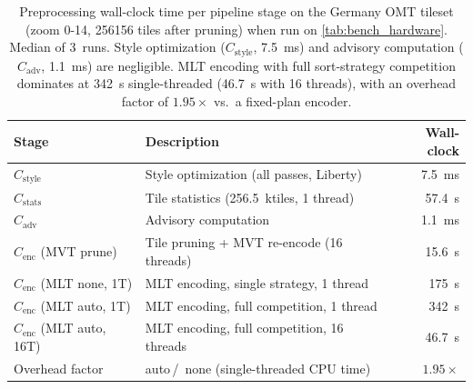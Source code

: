 \begin{table}[H]
	\centering\small
	\begin{tabular}{l l r}
		\textbf{Stage} & \textbf{Description} & \textbf{Wall-clock} \\
		\midrule
		$C_\text{style}$ & Style optimization (all passes, Liberty) & \qty{7.5}{\milli\second} \\
		$C_\text{stats}$ & Tile statistics (\qty{256.5}{\kilo tiles}, 1 thread) & \qty{57.4}{\second} \\
		$C_\text{adv}$ & Advisory computation & \qty{1.1}{\milli\second} \\
		$C_\text{enc}$ (\ac{MVT} prune) & Tile pruning + \ac{MVT} re-encode (16 threads) & \qty{15.6}{\second} \\
		$C_\text{enc}$ (\ac{MLT} none, 1T) & \ac{MLT} encoding, single strategy, 1 thread & \qty{175}{\second} \\
		$C_\text{enc}$ (\ac{MLT} auto, 1T) & \ac{MLT} encoding, full competition, 1 thread & \qty{342}{\second} \\
		$C_\text{enc}$ (\ac{MLT} auto, 16T) & \ac{MLT} encoding, full competition, 16 threads & \qty{46.7}{\second} \\
		\midrule
		Overhead factor & auto\,/ \,none (single-threaded CPU time) & $1.95\times$ \\
	\end{tabular}
	\caption{
		Preprocessing wall-clock time per pipeline stage on the Germany \ac{OMT} tileset (zoom 0-14, \num{256156} tiles after pruning) when run on \cref{tab:bench_hardware}.
		Median of 3~runs.
		Style optimization ($C_\text{style}$, \qty{7.5}{\milli\second}) and advisory computation ($C_\text{adv}$, \qty{1.1}{\milli\second}) are negligible.
		\ac{MLT} encoding with full sort-strategy competition dominates at \qty{342}{\second} single-threaded (\qty{46.7}{\second} with 16 threads), with an overhead factor of $1.95\times$ vs.\ a fixed-plan encoder.}
	\label{tab:preprocessing_cost}
\end{table}

\clearpage
\ifodd\value{page}\else
\clearpage
\fi

